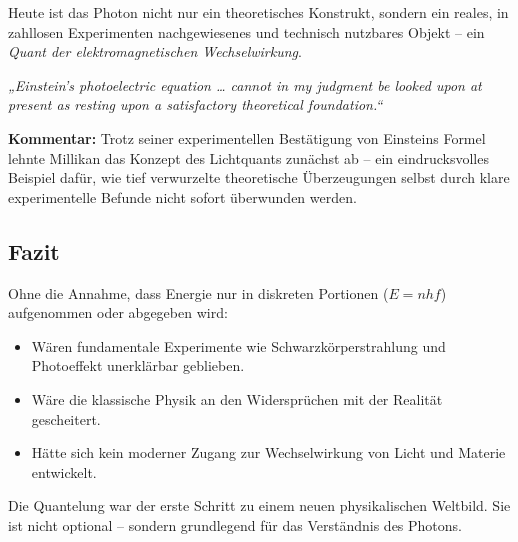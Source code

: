 Heute ist das Photon nicht nur ein theoretisches Konstrukt, sondern ein reales, in zahllosen Experimenten nachgewiesenes und technisch nutzbares Objekt – ein \emph{Quant der elektromagnetischen Wechselwirkung}.
\vspace{1em}
\begin{tcolorbox}[physikbox, title=Robert A. Millikan über Einstein (1916) \cite{millikan_1916}]
	\label{box:millikan-einstein}
	\emph{„Einstein’s photoelectric equation … cannot in my judgment be looked upon at present as resting upon a satisfactory theoretical foundation.“}
	
	\vspace{6pt}
	\textbf{Kommentar:} Trotz seiner experimentellen Bestätigung von Einsteins Formel lehnte Millikan das Konzept des Lichtquants zunächst ab – ein eindrucksvolles Beispiel dafür, wie tief verwurzelte theoretische Überzeugungen selbst durch klare experimentelle Befunde nicht sofort überwunden werden.
\end{tcolorbox}

\subsection{Fazit}
\vspace{1em}
\begin{tcolorbox}[hypobox, title={Was wäre, wenn nicht gequantelt wäre?}]
	\label{box:hypo-keine-quanten}
	Ohne die Annahme, dass Energie nur in diskreten Portionen ($E = nhf$) aufgenommen oder abgegeben wird:
	\begin{itemize}
		\item Wären fundamentale Experimente wie Schwarzkörperstrahlung und Photoeffekt unerklärbar geblieben.
		\item Wäre die klassische Physik an den Widersprüchen mit der Realität gescheitert.
		\item Hätte sich kein moderner Zugang zur Wechselwirkung von Licht und Materie entwickelt.
	\end{itemize}
	Die Quantelung war der erste Schritt zu einem neuen physikalischen Weltbild. Sie ist nicht optional – sondern grundlegend für das Verständnis des Photons.
\end{tcolorbox}

